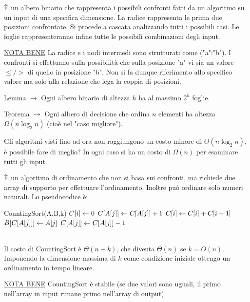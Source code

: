 \documentclass[8pt]{extarticle}
\begin{document}
\begin{formulario}
		\begin{tcenter}
		\end{tcenter}
È un albero binario che rappresenta i possibili confronti fatti da un algoritmo su un input di una specifica dimensione. La radice rappresenta le prima due posizioni confrontate. Si procede a cascata analizzando tutti i possibili casi. Le foglie rappresenteranno infine tutte le possibili combinazioni degli input. 
		\begin{descr}{1}
\item[\underline{NOTA BENE}] La radice e i nodi intermedi sono strutturati come ("a":"b"). I confronti si effettuano sulla possibilità che sulla posizione "a" vi sia un valore $\leq />$ di quello in posizione "b". Non si fa dunque riferimento allo specifico valore ma solo alla relazione che lega la coppia di posizioni.
		\end{descr}
		\begin{descr}{0}
\item[Lemma] $\rightarrow$ Ogni albero binario di altezza $h$ ha al massimo $2^h$ foglie.
\item[Teorema] $\rightarrow$ Ogni albero di decisione che ordina $n$ elementi ha altezza $\Omega(n\log_2n)$ (cioè nel "caso migliore").
		\end{descr}
\myRule

		\begin{tcenter}
		\end{tcenter}
Gli algoritmi visti fino ad ora non raggiungono un costo minore di $\Theta(n\log_2n)$, è possibile fare di meglio? In ogni caso si ha un costo di $\Omega(n)$ per esaminare tutti gli input.
\myRule

		\begin{tcenter}
		\end{tcenter}
È un algoritmo di ordinamento che non si basa sui confronti, ma richiede due array di supporto per effettuare l'ordinamento. Inoltre può ordinare solo numeri naturali. Lo pseudocodice è: 
		\begin{code}{CountingSort(A,B,k)}
\li {}
	\li $C[i]\leftarrow 0$
\End
\li {}
	\li $C[A[j]]\leftarrow C[A[j]]+1$
\End
\li {}
	\li $C[i]\leftarrow C[i]+C[i-1]$
\End
\li {}
	\li $B[C[A[j]]]\leftarrow A[j]$
	\li $C[A[j]]\leftarrow C[A[j]]-1$
\End
		\end{code}
\\
Il costo di CountingSort è $\Theta(n+k)$, che diventa $\Theta(n)$ se $k=O(n)$. Imponendo la dimensione massima di $k$ come condizione iniziale ottengo un ordinamento in tempo lineare.
		\begin{descr}{1}
\item[\underline{NOTA BENE}] CountingSort è stabile (se due valori sono uguali, il primo nell'array in input rimane primo nell'array di output).
		\end{descr} 
\myRule 


\end{formulario}
\end{document}
